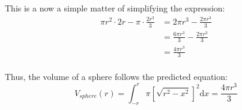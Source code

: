 \documentclass[11pt]{article}
\begin{document}
This is a now a simple matter of simplifying the expression:
\begin{equation}
\begin{split}
\pi r^{2}\cdot 2r-\pi\cdot \frac{2r^{3}}{3}
&=      2\pi r^{3}    -\frac{2\pi r^{3}}{3}\\
&=\frac{6\pi r^{3}}{3}-\frac{2\pi r^{3}}{3}\\
&=\frac{4\pi r^{3}}{3}\\
\end{split}
\end{equation}

Thus, the volume of a sphere follows the predicted equation:
\begin{equation}
V_{sphere}(r)=\int_{-r}^{r}\pi\left [\sqrt{r^{2}-x^{2}}\right ]^{2}\mathrm dx=\frac{4\pi r^{3}}{3}
\end{equation}
\end{document}

